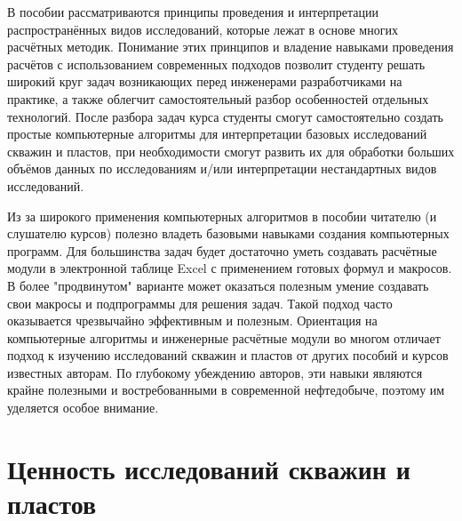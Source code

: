 \documentclass[oneside, openany]{memoir}
\begin{document}

В пособии рассматриваются принципы проведения и интерпретации распространённых видов исследований, которые лежат в основе многих расчётных методик. Понимание этих принципов и владение навыками проведения расчётов с использованием современных подходов позволит студенту решать широкий круг задач возникающих перед инженерами разработчиками на практике, а также облегчит самостоятельный разбор особенностей отдельных технологий. После разбора задач курса студенты смогут самостоятельно создать простые компьютерные алгоритмы для интерпретации базовых исследований скважин и пластов, при необходимости смогут развить их для обработки больших объёмов данных по исследованиям и/или интерпретации нестандартных видов исследований. 

Из за широкого применения компьютерных алгоритмов в пособии читателю (и слушателю курсов) полезно владеть базовыми навыками создания компьютерных программ. Для большинства задач будет достаточно уметь создавать расчётные модули в электронной таблице Excel с применением готовых формул и макросов. В более "продвинутом" варианте может оказаться полезным умение создавать свои макросы и подпрограммы для решения задач. Такой подход часто оказывается чрезвычайно эффективным и полезным. Ориентация на компьютерные алгоритмы и инженерные расчётные модули во многом отличает подход к изучению исследований скважин и пластов от других пособий и курсов известных авторам. По глубокому убеждению авторов, эти навыки являются крайне полезными и востребованными в современной нефтедобыче, поэтому им уделяется особое внимание.  



\chapter{Ценность исследований скважин и пластов}


\end{document}
